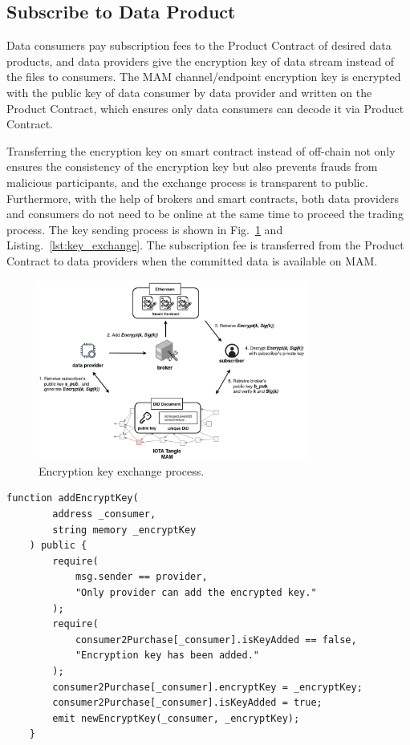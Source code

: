 \documentclass[conference]{IEEEtran}
\begin{document}
\subsection{Subscribe to Data Product}
Data consumers pay subscription fees to the Product Contract of desired data products, and data providers give the encryption key of data stream instead of the files to consumers. The MAM channel/endpoint encryption key is encrypted with the public key of data consumer by data provider and written on the Product Contract, which ensures only data consumers can decode it via Product Contract.

Transferring the encryption key on smart contract instead of off-chain not only ensures the consistency of the encryption key but also prevents frauds from malicious participants, and the exchange process is transparent to public. Furthermore, with the help of brokers and smart contracts, both data providers and consumers do not need to be online at the same time to proceed the trading process. The key sending process is shown in Fig.~\ref{fig:key_exchange} and Listing.~\ref{lst:key_exchange}. The subscription fee is transferred from the Product Contract to data providers when the committed data is available on MAM.

\begin{figure}[!t]
    \centering
    \includegraphics[width=3.5in]{key_exchange}
    \caption{Encryption key exchange process.}
    \label{fig:key_exchange}
\end{figure}

\lstset{style=solidity}

\begin{lstlisting}[caption={Add encryption key to data consumers}, label={lst:key_exchange}, frame=single]
    function addEncryptKey(
        address _consumer,
        string memory _encryptKey
    ) public {
        require(
            msg.sender == provider,
            "Only provider can add the encrypted key."
        );
        require(
            consumer2Purchase[_consumer].isKeyAdded == false,
            "Encryption key has been added."
        );
        consumer2Purchase[_consumer].encryptKey = _encryptKey;
        consumer2Purchase[_consumer].isKeyAdded = true;
        emit newEncryptKey(_consumer, _encryptKey);
    }
\end{lstlisting}
\end{document}

